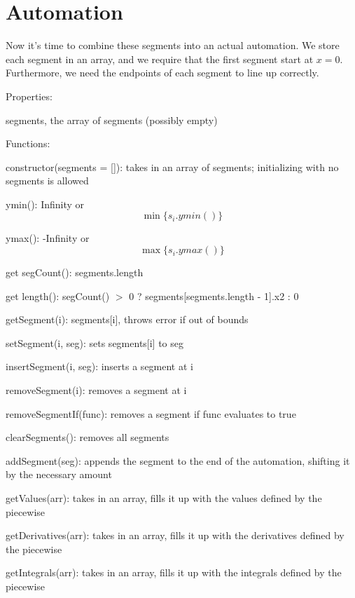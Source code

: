 \documentclass{article}
\begin{document}







\section{Automation}

Now it's time to combine these segments into an actual automation. We store each segment in an array, and we require that the first segment start at $x=0$. Furthermore, we need the endpoints of each segment to line up correctly.

Properties:

segments, the array of segments (possibly empty)

Functions:

constructor(segments = []): takes in an array of segments; initializing with no segments is allowed

ymin(): Infinity or $$\min\{s_i.ymin()\}$$

ymax(): -Infinity or $$\max\{s_i.ymax()\}$$

get segCount(): segments.length

get length(): segCount() $>$ 0 ? segments[segments.length - 1].x2 : 0

getSegment(i): segments[i], throws error if out of bounds

setSegment(i, seg): sets segments[i] to seg

insertSegment(i, seg): inserts a segment at i

removeSegment(i): removes a segment at i

removeSegmentIf(func): removes a segment if func evaluates to true

clearSegments(): removes all segments

addSegment(seg): appends the segment to the end of the automation, shifting it by the necessary amount

getValues(arr): takes in an array, fills it up with the values defined by the piecewise

getDerivatives(arr): takes in an array, fills it up with the derivatives defined by the piecewise

getIntegrals(arr): takes in an array, fills it up with the integrals defined by the piecewise
\end{document}
